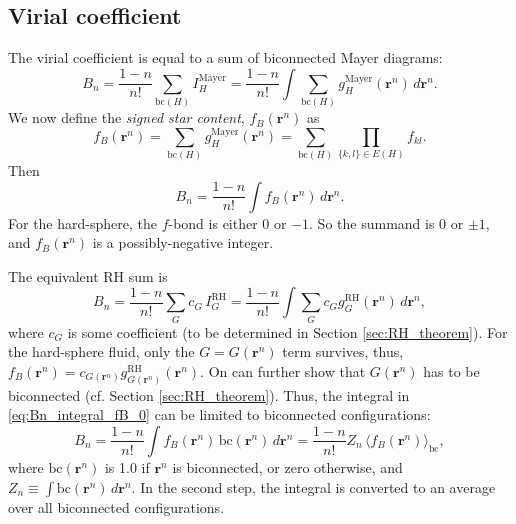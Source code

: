 \documentclass[aip,jcp,preprint,superscriptaddress,showpacs,preprintnumbers,amsmath,amssymb]{revtex4-1}
\numberwithin{equation}{section}
\newcommand{\vct}[1]{\mathbf{#1}}
\providecommand{\vr}{} %
\renewcommand{\vr}{\vct{r}}
\begin{document}
\subsection{Virial coefficient}




The virial coefficient is equal to
a sum of biconnected Mayer diagrams\cite{
uhlenbeck1962, hansen}:
%
%
%
\begin{equation*}
B_n
=
\frac{1 - n}{n!}
\sum_{\mathrm{bc}(H)}
I_H^\mathrm{Mayer}
=
\frac{1 - n}{n!}
\int
\sum_{\mathrm{bc}(H)}
g_H^\mathrm{Mayer}(\vr^n) \, d\vr^n.
\end{equation*}
%
%
%
We now define the \emph{signed star content},
$f_B(\vr^n)$ as
%
\begin{equation}
f_B(\vr^n)
=
\sum_{\mathrm{bc}(H)} g_H^\mathrm{Mayer}(\vr^n)
=
\sum_{\mathrm{bc}(H)}
\prod_{\{k,l\} \in E(H)} f_{kl}.
\label{eq:fB_def}
\end{equation}
%
%
%
Then
%
%
%
\begin{equation}
B_n
=
\frac{1-n}{n!}
\int f_B(\vr^n) \, d\vr^n.
\label{eq:Bn_integral_fB_0}
\end{equation}
%
For the hard-sphere,
the $f$-bond is either $0$ or $-1$.
%
So the summand is $0$ or $\pm 1$,
and $f_B(\vr^n)$ is a possibly-negative integer.



The equivalent RH sum is
%
%
%
\begin{equation*}
B_n
=
\frac{1 - n}{n!}
\sum_G c_G \, I_G^\mathrm{RH}
=
\frac{1 - n}{n!}
\int
\sum_G c_G g_G^\mathrm{RH}(\vr^n) \, d\vr^n,
\end{equation*}
%
%
%
where $c_G$ is some coefficient
(to be determined in Section \ref{sec:RH_theorem}).
%
For the hard-sphere fluid,
only the $G = G(\vr^n)$ term survives,
thus,
$f_B(\vr^n) = c_{G(\vr^n)} g_{G(\vr^n)}^\mathrm{RH}(\vr^n)$.
%
On can further show that
$G(\vr^n)$ has to be biconnected
(cf. Section \ref{sec:RH_theorem}).
%
Thus, the integral in \eqref{eq:Bn_integral_fB_0}
can be limited to biconnected configurations:
%
%
%
\begin{equation}
B_n =
\frac{1 - n}{n!}
\int
f_B(\vr^n) \, \mathrm{bc}(\vr^n) \, d\vr^n
=
\frac{1-n}{n!}
Z_n \,
\langle f_B(\vr^n) \rangle_\mathrm{bc},
\label{eq:Bn_integral_fB}
\end{equation}
%
%
%
where $\mathrm{bc}(\vr^n)$ is 1.0
if $\vr^n$ is biconnected,
or zero otherwise,
and $Z_n \equiv \int \mathrm{bc}(\vr^n) \, d\vr^n$.
%
In the second step,
the integral is converted to an average
over all biconnected configurations\cite{zhang2014}.
%
\end{document}
